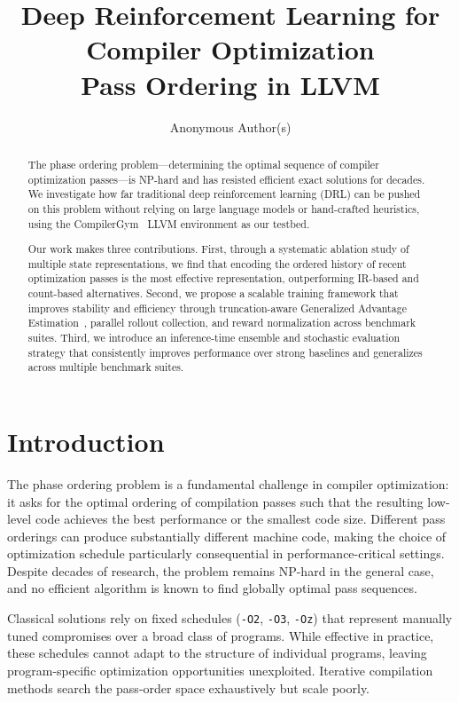 \documentclass{article}
\title{Deep Reinforcement Learning for Compiler Optimization\\
       Pass Ordering in LLVM}
\author{Anonymous Author(s)}
\begin{document}
\maketitle

\begin{abstract}
The phase ordering problem---determining the optimal sequence of compiler
optimization passes---is NP-hard and has resisted efficient exact solutions for
decades.  We investigate how far traditional deep reinforcement learning (DRL)
can be pushed on this problem without relying on large language models or
hand-crafted heuristics, using the CompilerGym~\cite{CompilerGym} LLVM
environment as our testbed.

Our work makes three contributions.
First, through a systematic ablation study of multiple state representations, we find that encoding the ordered history of recent optimization passes is the most effective representation, outperforming IR-based and count-based alternatives. Second, we propose a scalable training framework that improves stability and efficiency through truncation-aware  Generalized Advantage Estimation~\cite{schulman2015high}, parallel rollout collection, and reward normalization across benchmark suites. Third, we introduce an inference-time ensemble and stochastic evaluation strategy that consistently improves performance over strong baselines and generalizes across multiple benchmark suites.
\end{abstract}


\section{Introduction}

The phase ordering problem is a fundamental challenge in compiler optimization:
it asks for the optimal ordering of compilation passes such that the resulting
low-level code achieves the best performance or the smallest code size.
Different pass orderings can produce substantially different machine code,
making the choice of optimization schedule particularly consequential in
performance-critical settings.
Despite decades of research, the problem remains NP-hard in the general case,
and no efficient algorithm is known to find globally optimal pass sequences.

Classical solutions rely on fixed schedules (\texttt{-O2}, \texttt{-O3},
\texttt{-Oz}) that represent manually tuned compromises over a broad class of
programs.  While effective in practice, these schedules cannot adapt to the
structure of individual programs, leaving program-specific optimization
opportunities unexploited.  Iterative compilation methods search the pass-order
space exhaustively but scale poorly.
\end{document}
